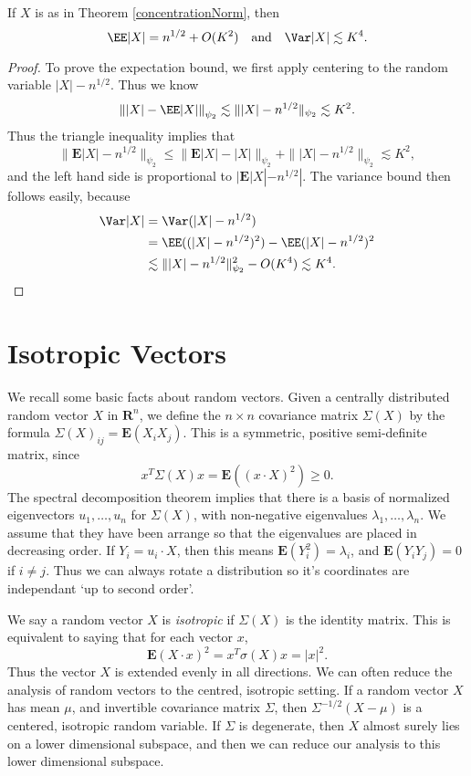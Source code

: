 \begin{corollary}
    If $X$ is as in Theorem \ref{concentrationNorm}, then
    \[ \EE |X| = n^{1/2} + O(K^2)\quad\text{and}\quad\Var |X| \lesssim K^4. \]
\end{corollary}
\begin{proof}
    To prove the expectation bound, we first apply centering to the random variable $|X| - n^{1/2}$. Thus we know
    \[ \left\| |X| - \EE |X| \right\|_{\psi_2} \lesssim \| |X| - n^{1/2} \|_{\psi_2} \lesssim K^2. \]
    Thus the triangle inequality implies that
    \[ \| \mathbf{E} |X| - n^{1/2} \|_{\psi_2} \leq \| \mathbf{E} |X| - |X| \|_{\psi_2} + \| |X| - n^{1/2} \|_{\psi_2} \lesssim K^2, \]
    and the left hand side is proportional to $| \mathbf{E} |X| - n^{1/2} |$. The variance bound then follows easily, because
    \begin{align*}
        \Var |X| &= \Var(|X| - n^{1/2})\\
        &= \EE((|X| - n^{1/2})^2) - \EE(|X| - n^{1/2})^2\\
        &\lesssim \| |X| - n^{1/2} \|_{\psi_2}^2 - O(K^4) \lesssim K^4. \qedhere
    \end{align*}
\end{proof}

\section{Isotropic Vectors}

We recall some basic facts about random vectors. Given a centrally distributed random vector $X$ in $\mathbf{R}^n$, we define the $n \times n$ covariance matrix $\Sigma(X)$ by the formula $\Sigma(X)_{ij} = \mathbf{E}(X_iX_j)$. This is a symmetric, positive semi-definite matrix, since
%
\[ x^T \Sigma(X) x = \mathbf{E}((x \cdot X)^2) \geq 0. \]
%
The spectral decomposition theorem implies that there is a basis of normalized eigenvectors $u_1, \dots, u_n$ for $\Sigma(X)$, with non-negative eigenvalues $\lambda_1, \dots, \lambda_n$. We assume that they have been arrange so that the eigenvalues are placed in decreasing order. If $Y_i = u_i \cdot X$, then this means $\mathbf{E}(Y_i^2) = \lambda_i$, and $\mathbf{E}(Y_iY_j) = 0$ if $i \neq j$. Thus we can always rotate a distribution so it's coordinates are independant `up to second order'.

We say a random vector $X$ is {\it isotropic} if $\Sigma(X)$ is the identity matrix. This is equivalent to saying that for each vector $x$,
%
\[ \mathbf{E} (X \cdot x)^2 = x^T \sigma(X) x = |x|^2. \]
%
Thus the vector $X$ is extended evenly in all directions. We can often reduce the analysis of random vectors to the centred, isotropic setting. If a random vector $X$ has mean $\mu$, and invertible covariance matrix $\Sigma$, then $\Sigma^{-1/2} (X - \mu)$ is a centered, isotropic random variable. If $\Sigma$ is degenerate, then $X$ almost surely lies on a lower dimensional subspace, and then we can reduce our analysis to this lower dimensional subspace.

